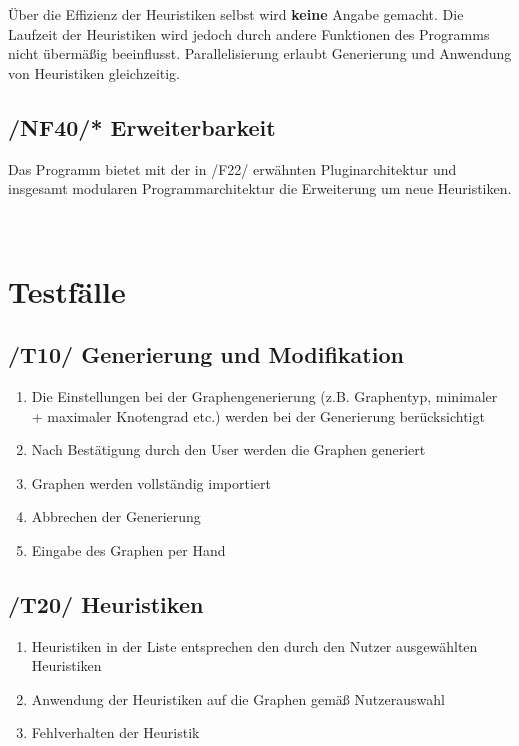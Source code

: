 \documentclass{article}
\begin{document}
	Über die Effizienz der Heuristiken selbst wird \textbf{keine} Angabe gemacht. Die Laufzeit der Heuristiken wird jedoch durch andere Funktionen des Programms nicht übermäßig beeinflusst. Parallelisierung erlaubt Generierung und Anwendung von Heuristiken gleichzeitig.
	
	\subsection*{/NF40/* Erweiterbarkeit} \label{nf40} 
	Das Programm bietet mit der in /F22/ erwähnten Pluginarchitektur und insgesamt modularen Programmarchitektur die Erweiterung um neue Heuristiken.
	
	
	~\newpage
	\section{Testfälle}
	\subsection*{/T10/ Generierung und Modifikation} \label{t10} 
	\begin{enumerate}[--]
		\item{Die Einstellungen bei der Graphengenerierung (z.B. Graphentyp, minimaler + maximaler Knotengrad etc.) werden bei der Generierung berücksichtigt}
		\item{Nach Bestätigung durch den User werden die Graphen generiert}
		\item{Graphen werden vollständig importiert}
		\item{Abbrechen der Generierung}
		\item{Eingabe des Graphen per Hand}
	\end{enumerate}
	
	\subsection*{/T20/ Heuristiken} \label{t20} 
	\begin{enumerate}[--]
		\item{Heuristiken in der Liste entsprechen den durch den Nutzer ausgewählten Heuristiken}
		\item{Anwendung der Heuristiken auf die Graphen gemäß Nutzerauswahl}
		\item{Fehlverhalten der Heuristik}
	\end{enumerate}
	
\end{document}
